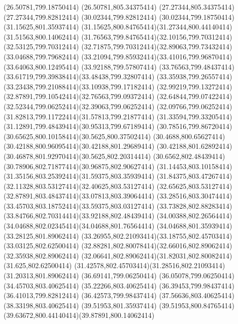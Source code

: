 {{	\closepath
	\moveto(26.50781,799.18750414)
	\lineto(26.50781,805.34375414)
	\lineto(27.27344,805.34375414)
	\lineto(27.27344,799.82812414)
	\lineto(30.02344,799.82812414)
	\lineto(30.02344,799.18750414)
	\closepath
	\moveto(31.15625,801.35937414)
	\curveto(31.15625,800.84765414)(31.27344,800.44140414)(31.51563,800.14062414)
	\curveto(31.76563,799.84765414)(32.10156,799.70312414)(32.53125,799.70312414)
	\curveto(32.71875,799.70312414)(32.89063,799.73432414)(33.04688,799.79682414)
	\curveto(33.21094,799.85932414)(33.41016,799.96870414)(33.64063,800.12495414)
	\lineto(33.92188,799.57807414)
	\curveto(33.76563,799.48437414)(33.61719,799.39838414)(33.48438,799.32807414)
	\curveto(33.35938,799.26557414)(33.23438,799.21088414)(33.10938,799.17182414)
	\curveto(32.99219,799.13272414)(32.87891,799.10542414)(32.76563,799.09372414)
	\curveto(32.64844,799.07422414)(32.52344,799.06252414)(32.39063,799.06252414)
	\curveto(32.09766,799.06252414)(31.82813,799.11722414)(31.57813,799.21877414)
	\curveto(31.33594,799.33205414)(31.12891,799.48439414)(30.95313,799.67189414)
	\curveto(30.78516,799.86720414)(30.65625,800.10158414)(30.5625,800.37502414)
	\curveto(30.4688,800.65627414)(30.42188,800.96095414)(30.42188,801.29689414)
	\curveto(30.42188,801.62892414)(30.46878,801.92970414)(30.5625,802.20314414)
	\curveto(30.6562,802.48439414)(30.78906,802.71877414)(30.96875,802.90627414)
	\curveto(31.14453,803.10158414)(31.35156,803.25392414)(31.59375,803.35939414)
	\curveto(31.84375,803.47267414)(32.11328,803.53127414)(32.40625,803.53127414)
	\curveto(32.65625,803.53127414)(32.87891,803.48437414)(33.07813,803.39064414)
	\curveto(33.28516,803.30474414)(33.45703,803.18752414)(33.59375,803.03127414)
	\curveto(33.73828,802.88283414)(33.84766,802.70314414)(33.92188,802.48439414)
	\curveto(34.00388,802.26564414)(34.04688,802.02345414)(34.04688,801.76564414)
	\lineto(34.04688,801.35939414)
	\closepath
	\moveto(33.28125,801.89062414)
	\curveto(33.26955,802.21093414)(33.18755,802.45703414)(33.03125,802.62500414)
	\curveto(32.88281,802.80078414)(32.66016,802.89062414)(32.35938,802.89062414)
	\curveto(32.06641,802.89062414)(31.82031,802.80082414)(31.625,802.62500414)
	\curveto(31.42578,802.45703414)(31.28516,802.21093414)(31.20313,801.89062414)
	\closepath
	\moveto(36.69141,799.06250414)
	\lineto(36.05078,799.06250414)
	\lineto(34.45703,803.40625414)
	\lineto(35.22266,803.40625414)
	\lineto(36.39453,799.98437414)
	\lineto(36.41013,799.82812414)
	\lineto(36.42573,799.98437414)
	\lineto(37.56636,803.40625414)
	\lineto(38.33198,803.40625414)
	\closepath
	\moveto(39.51953,801.35937414)
	\curveto(39.51953,800.84765414)(39.63672,800.44140414)(39.87891,800.14062414)
}}

